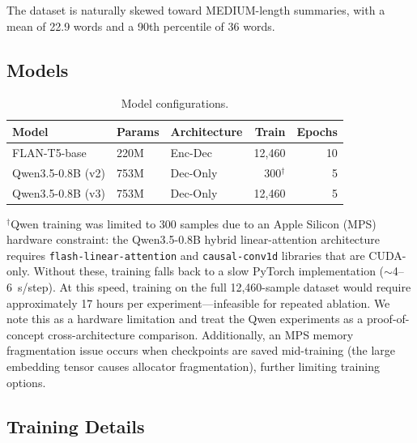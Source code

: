 \documentclass[11pt,a4paper]{article}
\begin{document}
The dataset is naturally skewed toward MEDIUM-length summaries, with a mean of 22.9 words and a 90th percentile of 36 words.

\subsection{Models}

\begin{table}[t]
\centering
\caption{Model configurations.}
\label{tab:models}
\small
\begin{tabular}{@{}lllrr@{}}
\toprule
\textbf{Model} & \textbf{Params} & \textbf{Architecture} & \textbf{Train} & \textbf{Epochs} \\
\midrule
FLAN-T5-base  & 220M & Enc-Dec  & 12,460 & 10 \\
Qwen3.5-0.8B (v2) & 753M & Dec-Only & 300$^\dagger$ & 5 \\
Qwen3.5-0.8B (v3) & 753M & Dec-Only & 12,460 & 5 \\
\bottomrule
\end{tabular}
\end{table}

$^\dagger$Qwen training was limited to 300 samples due to an Apple Silicon (MPS) hardware constraint: the Qwen3.5-0.8B hybrid linear-attention architecture requires \texttt{flash-linear-attention} and \texttt{causal-conv1d} libraries that are CUDA-only.
Without these, training falls back to a slow PyTorch implementation (${\sim}$4--6~s/step).
At this speed, training on the full 12,460-sample dataset would require approximately 17 hours per experiment---infeasible for repeated ablation.
We note this as a hardware limitation and treat the Qwen experiments as a proof-of-concept cross-architecture comparison.
Additionally, an MPS memory fragmentation issue occurs when checkpoints are saved mid-training (the large embedding tensor causes allocator fragmentation), further limiting training options.

\subsection{Training Details}
\end{document}
